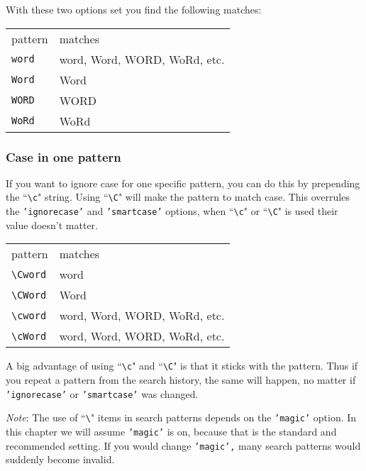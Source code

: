With these two options set you find the following matches:

\begin{center} \begin{tabular}{l l}
				pattern & matches \\
				\texttt{word} & word, Word, WORD, WoRd, etc.\\
				\texttt{Word} & Word\\
				\texttt{WORD} & WORD\\
				\texttt{WoRd} & WoRd\\
\end{tabular} \end{center}

\subsubsection{Case in one pattern}
If you want to ignore case for one specific pattern, you can do this by prepending the ``\texttt{\textbackslash{}c}" string.
Using ``\texttt{\textbackslash{}C}" will make the pattern to match case.
This overrules the \texttt{'ignorecase'} and \texttt{'smartcase'} options, when ``\texttt{\textbackslash{}c}" or ``\texttt{\textbackslash{}C}" is used their value doesn't matter.

\begin{center} \begin{tabular}{l l}
				pattern & matches \\
				\texttt{\textbackslash{}Cword} & word\\
				\texttt{\textbackslash{}CWord} & Word\\
				\texttt{\textbackslash{}cword} & word, Word, WORD, WoRd, etc.\\
				\texttt{\textbackslash{}cWord} & word, Word, WORD, WoRd, etc.\\
\end{tabular} \end{center}

A big advantage of using ``\texttt{\textbackslash{}c}" and ``\texttt{\textbackslash{}C}" is that it sticks with the pattern.
Thus if you repeat a pattern from the search history, the same will happen, no matter if \texttt{'ignorecase'} or \texttt{'smartcase'} was changed.

\emph{Note}: The use of ``\texttt{\textbackslash{}}" items in search patterns depends on the \texttt{'magic'} option.
In this chapter we will assume \texttt{'magic'} is on, because that is the standard and recommended setting.
If you would change \texttt{'magic',} many search patterns would suddenly become invalid.

